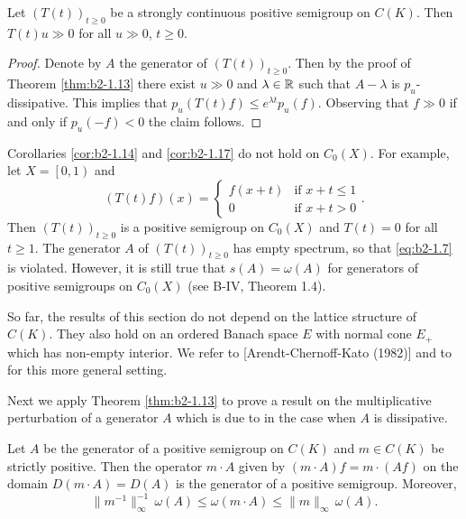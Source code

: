 \begin{corollary}\label{cor:b2-1.17}
Let $(T(t))_{t \geq 0}$ be a strongly continuous positive semigroup on $C(K)$.
Then $T(t)u \gg 0$ for all $u \gg 0$, $t \geq 0$.
\end{corollary}
\begin{proof}
Denote by $A$ the generator of $(T(t))_{t \geq 0}$.
Then by the proof of Theorem \ref{thm:b2-1.13} there exist $u \gg 0$ and $\lambda \in \mathbb{R}$ such that $A - \lambda$ is $p_{u}$-dissipative.
This implies that $p_{u}(T(t)f) \leq e^{\lambda t}p_{u}(f)$.
Observing that $f \gg 0$ if and only if $p_{u}(-f) < 0$ the claim follows.
\end{proof}
\begin{remark}\label{rem:b2-1.18}
Corollaries \ref{cor:b2-1.14} and \ref{cor:b2-1.17} do not hold on $C_{0}(X)$.
For example, let $X = \left[0,1\right)$ and
\[
    (T(t)f)(x) = \begin{cases}
        f(x+t) & \text{if } x+t \leq 1 \\
        0 & \text{if } x+t > 0
    \end{cases}.
\]
Then $(T(t))_{t \geq 0}$ is a positive semigroup on $C_{0}(X)$ and $T(t) = 0$ for all $t \geq 1$.
The generator $A$ of $(T(t))_{t \geq 0}$ has empty spectrum, so that \eqref{eq:b2-1.7} is violated.
However, it is still true that $s(A) = \omega(A)$ for generators of positive semigroups on $C_{0}(X)$ (see B-IV, Theorem 1.4).
\end{remark}
\begin{remark}\label{rem:b2-1.19}
So far, the results of this section do not depend on the lattice structure of $C(K)$.
They also hold on an ordered Banach space $E$ with normal cone $E_{+}$ which has non-empty interior.
We refer to \citet{arendtchernoffkato:1982} [Arendt-Chernoff-Kato (1982)] and to \citet{battyrobinson:1984} for this more general setting.
\end{remark}
Next we apply Theorem \ref{thm:b2-1.13} to prove a result on the multiplicative perturbation of a generator $A$ which is due to \citet{dorroh:1966} in the case when $A$ is dissipative.
\begin{theorem}\label{thm:b2-1.20}
Let $A$ be the generator of a positive semigroup on $C(K)$ and $m \in C(K)$ be strictly positive.
Then the operator $m \cdot A$ given by $(m \cdot A)f = m \cdot (Af)$ on the domain $D(m \cdot A) = D(A)$ is the generator of a positive semigroup.
Moreover,
\begin{equation}\label{eq:b2-1.10}
\|m^{-1}\|_{\infty}^{-1}\, \omega(A) \leq \omega(m \cdot A) \leq \|m\|_{\infty}\, \omega(A).
\end{equation}
\end{theorem}
